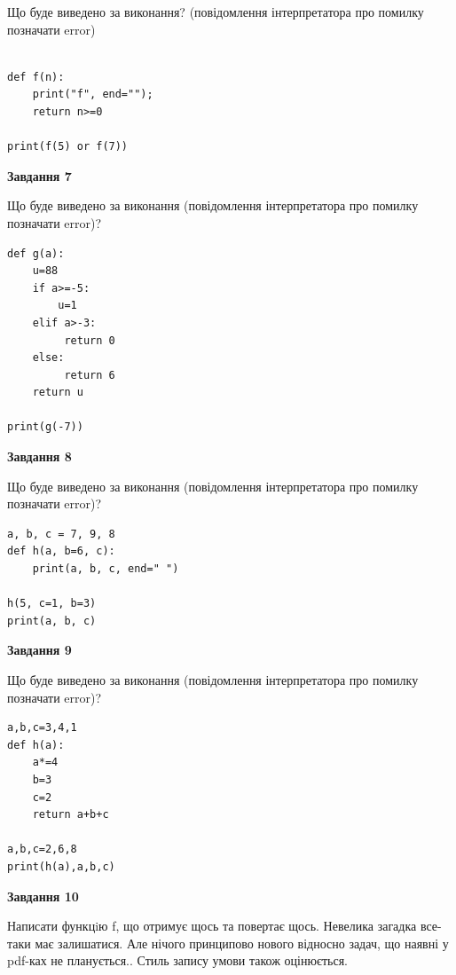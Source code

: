 \documentclass[12pt, ukrainian]{article}
\begin{document}
{\begin {large}
Що буде виведено за виконання? (повідомлення інтерпретатора про помилку позначати error)\par
\begin{verbatim}

def f(n):
    print("f", end="");
    return n>=0

print(f(5) or f(7))
\end{verbatim}

{\begin {center}\textbf{Завдання 7}\end {center}}

Що буде виведено за виконання (повідомлення інтерпретатора про помилку позначати error)?\par
\begin{verbatim}
def g(a):
    u=88
    if a>=-5: 
        u=1
    elif a>-3:
         return 0
    else:
         return 6
    return u

print(g(-7))
\end{verbatim}

{\begin {center}\textbf{Завдання 8}\end {center}}

Що буде виведено за виконання (повідомлення інтерпретатора про помилку позначати error)?\par
\begin{verbatim}
a, b, c = 7, 9, 8
def h(a, b=6, c):
    print(a, b, c, end=" ")

h(5, c=1, b=3)
print(a, b, c)
\end{verbatim}

{\begin {center}\textbf{Завдання 9}\end {center}}

Що буде виведено за виконання (повідомлення інтерпретатора про помилку позначати error)?\par
\begin{verbatim}
a,b,c=3,4,1
def h(a):
    a*=4
    b=3
    c=2
    return a+b+c

a,b,c=2,6,8
print(h(a),a,b,c)
\end{verbatim}

{\begin {center}\textbf{Завдання 10}\end {center}}


Написати функцiю f, що отримує щось та повертає щось. Невелика загадка все-таки має залишатися. Але нічого принципово нового відносно задач, що наявні у pdf-ках не планується.. Стиль запису умови також оцінюється.\par
\end {large}}
\newpage
\end{document}
